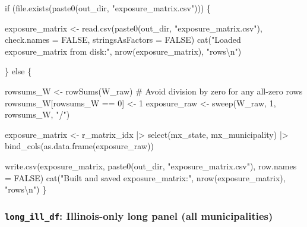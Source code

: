 \documentclass[
  11pt,
  letterpaper,
  DIV=11,
  numbers=noendperiod]{scrartcl}
\newenvironment{Shaded}{}{}
\newcommand{\AttributeTok}[1]{\textcolor[rgb]{0.84,0.23,0.29}{#1}}
\newcommand{\CommentTok}[1]{\textcolor[rgb]{0.42,0.45,0.49}{#1}}
\newcommand{\ConstantTok}[1]{\textcolor[rgb]{0.00,0.36,0.77}{#1}}
\newcommand{\ControlFlowTok}[1]{\textcolor[rgb]{0.84,0.23,0.29}{#1}}
\newcommand{\DecValTok}[1]{\textcolor[rgb]{0.00,0.36,0.77}{#1}}
\newcommand{\FunctionTok}[1]{\textcolor[rgb]{0.44,0.26,0.76}{#1}}
\newcommand{\NormalTok}[1]{\textcolor[rgb]{0.14,0.16,0.18}{#1}}
\newcommand{\OtherTok}[1]{\textcolor[rgb]{0.44,0.26,0.76}{#1}}
\newcommand{\SpecialCharTok}[1]{\textcolor[rgb]{0.00,0.36,0.77}{#1}}
\newcommand{\StringTok}[1]{\textcolor[rgb]{0.01,0.18,0.38}{#1}}
\begin{document}
\begin{Shaded}
\begin{Highlighting}[]
\ControlFlowTok{if}\NormalTok{ (}\FunctionTok{file.exists}\NormalTok{(}\FunctionTok{paste0}\NormalTok{(out\_dir, }\StringTok{"exposure\_matrix.csv"}\NormalTok{))) \{}

\NormalTok{  exposure\_matrix }\OtherTok{\textless{}{-}} \FunctionTok{read.csv}\NormalTok{(}\FunctionTok{paste0}\NormalTok{(out\_dir, }\StringTok{"exposure\_matrix.csv"}\NormalTok{),}
                               \AttributeTok{check.names =} \ConstantTok{FALSE}\NormalTok{,}
                               \AttributeTok{stringsAsFactors =} \ConstantTok{FALSE}\NormalTok{)}
  \FunctionTok{cat}\NormalTok{(}\StringTok{"Loaded exposure\_matrix from disk:"}\NormalTok{, }\FunctionTok{nrow}\NormalTok{(exposure\_matrix), }\StringTok{"rows}\SpecialCharTok{\textbackslash{}n}\StringTok{"}\NormalTok{)}

\NormalTok{\} }\ControlFlowTok{else}\NormalTok{ \{}

\NormalTok{  rowsums\_W       }\OtherTok{\textless{}{-}} \FunctionTok{rowSums}\NormalTok{(W\_raw)}
  \CommentTok{\# Avoid division by zero for any all{-}zero rows}
\NormalTok{  rowsums\_W[rowsums\_W }\SpecialCharTok{==} \DecValTok{0}\NormalTok{] }\OtherTok{\textless{}{-}} \DecValTok{1}
\NormalTok{  exposure\_raw    }\OtherTok{\textless{}{-}} \FunctionTok{sweep}\NormalTok{(W\_raw, }\DecValTok{1}\NormalTok{, rowsums\_W, }\StringTok{"/"}\NormalTok{)}

\NormalTok{  exposure\_matrix }\OtherTok{\textless{}{-}}\NormalTok{ r\_matrix\_idx }\SpecialCharTok{|\textgreater{}}
    \FunctionTok{select}\NormalTok{(mx\_state, mx\_municipality) }\SpecialCharTok{|\textgreater{}}
    \FunctionTok{bind\_cols}\NormalTok{(}\FunctionTok{as.data.frame}\NormalTok{(exposure\_raw))}

  \FunctionTok{write.csv}\NormalTok{(exposure\_matrix, }\FunctionTok{paste0}\NormalTok{(out\_dir, }\StringTok{"exposure\_matrix.csv"}\NormalTok{),}
            \AttributeTok{row.names =} \ConstantTok{FALSE}\NormalTok{)}
  \FunctionTok{cat}\NormalTok{(}\StringTok{"Built and saved exposure\_matrix:"}\NormalTok{, }\FunctionTok{nrow}\NormalTok{(exposure\_matrix), }\StringTok{"rows}\SpecialCharTok{\textbackslash{}n}\StringTok{"}\NormalTok{)}
\NormalTok{\}}
\end{Highlighting}
\end{Shaded}

\subsubsection{\texorpdfstring{\texttt{long\_ill\_df}: Illinois-only
long panel (all
municipalities)}{long\_ill\_df: Illinois-only long panel (all municipalities)}}\label{long_ill_df-illinois-only-long-panel-all-municipalities}
\end{document}

